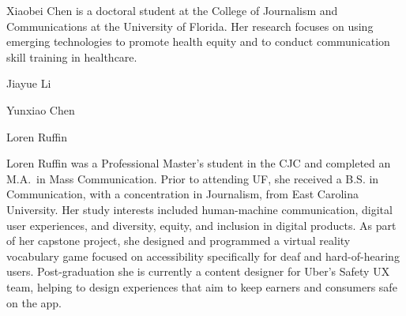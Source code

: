 \documentclass[]{article}
\begin{document}
Xiaobei Chen is a doctoral student at the College of Journalism and
Communications at the University of Florida. Her research focuses on
using emerging technologies to promote health equity and to conduct
communication skill training in healthcare.

Jiayue Li

Yunxiao Chen

Loren Ruffin

Loren Ruffin was a Professional Master's student in the CJC and
completed an M.A.~in Mass Communication. Prior to attending UF, she
received a B.S. in Communication, with a concentration in Journalism,
from East Carolina University. Her study interests included
human-machine communication, digital user experiences, and diversity,
equity, and inclusion in digital products. As part of her capstone
project, she designed and programmed a virtual reality vocabulary game
focused on accessibility specifically for deaf and hard-of-hearing
users. Post-graduation she is currently a content designer for Uber's
Safety UX team, helping to design experiences that aim to keep earners
and consumers safe on the app.
\end{document}
